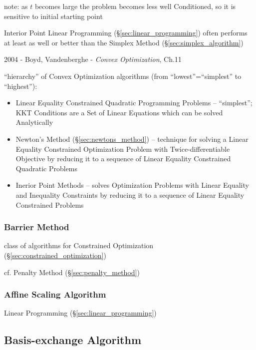 note: as $t$ becomes large the problem becomes less well Conditioned, so it is
sensitive to initial starting point

\fist Interior Point Linear Programming (\S\ref{sec:linear_programming}) often
performs at least as well or better than the Simplex Method
(\S\ref{sec:simplex_algorithm})


\asterism

2004 - Boyd, Vandenberghe - \emph{Convex Optimization}, Ch.11

``hierarchy'' of Convex Optimization algorithms (from ``lowest''=``simplest'' to
``highest''):
\begin{itemize}
  \item Linear Equality Constrained Quadratic Programming Problems --
    ``simplest''; KKT Conditions are a Set of Linear Equations which can be
    solved Analytically
  \item Newton's Method (\S\ref{sec:newtons_method}) -- technique for solving a
    Linear Equality Constrained Optimization Problem with Twice-differentiable
    Objective by reducing it to a sequence of Linear Equality Constrained
    Quadratic Problems
  \item Inerior Point Methods -- solves Optimization Problems with Linear
    Equality and Inequality Constraints by reducing it to a sequence of Linear
    Equality Constrained Problems
\end{itemize}



\subsubsection{Barrier Method}\label{sec:barrier_method}

class of algorithms for Constrained Optimization
(\S\ref{sec:constrained_optimization})

cf. Penalty Method (\S\ref{sec:penalty_method})



\subsubsection{Affine Scaling Algorithm}\label{sec:affine_scaling}

Linear Programming (\S\ref{sec:linear_programming})



\subsection{Basis-exchange Algorithm}\label{sec:basis_exchange}

